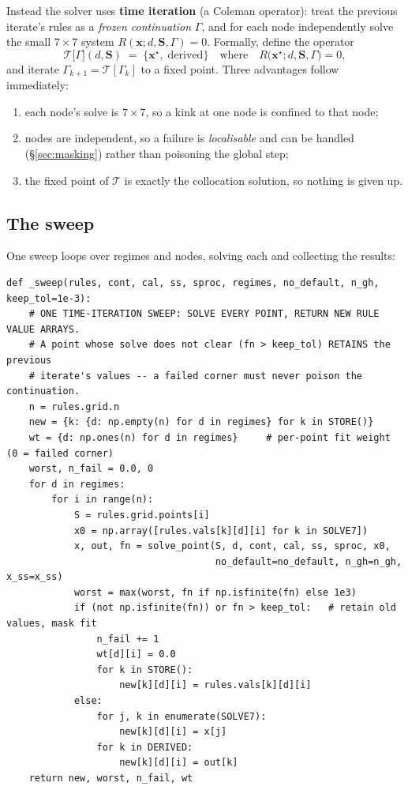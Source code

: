 \documentclass[11pt]{article}
\numberwithin{equation}{section}
\newcommand{\code}[1]{\texttt{\small #1}}
\newcommand{\bx}{\mathbf{x}}
\newcommand{\bS}{\mathbf{S}}
\theoremstyle{definition}
\theoremstyle{plain}
\theoremstyle{remark}
\begin{document}
Instead the solver uses \textbf{time iteration} (a Coleman operator): treat the
previous iterate's rules as a \emph{frozen continuation} $\Gamma$, and for each node
independently solve the small $7\times7$ system $R(\bx;d,\bS,\Gamma)=0$. Formally,
define the operator
\begin{equation}
\mathcal{T}\bigl[\Gamma\bigr](d,\bS)\;=\;\bigl\{\bx^{\star},\;\text{derived}\bigr\}
\quad\text{where}\quad R\bigl(\bx^{\star};d,\bS,\Gamma\bigr)=0 ,
\label{eq:coleman}
\end{equation}
and iterate $\Gamma_{k+1}=\mathcal{T}[\Gamma_k]$ to a fixed point. Three advantages
follow immediately:

\begin{enumerate}
\item each node's solve is $7\times7$, so a kink at one node is confined to that node;
\item nodes are independent, so a failure is \emph{localisable} and can be handled
      (\S\ref{sec:masking}) rather than poisoning the global step;
\item the fixed point of $\mathcal{T}$ is exactly the collocation solution, so
      nothing is given up.
\end{enumerate}

\subsection{The sweep}

One sweep loops over regimes and nodes, solving each and collecting the results:

\begin{lstlisting}[caption={One time-iteration sweep. \code{recursive\_main.py}, \code{\_sweep}.}]
def _sweep(rules, cont, cal, ss, sproc, regimes, no_default, n_gh, keep_tol=1e-3):
    # ONE TIME-ITERATION SWEEP: SOLVE EVERY POINT, RETURN NEW RULE VALUE ARRAYS.
    # A point whose solve does not clear (fn > keep_tol) RETAINS the previous
    # iterate's values -- a failed corner must never poison the continuation.
    n = rules.grid.n
    new = {k: {d: np.empty(n) for d in regimes} for k in STORE()}
    wt = {d: np.ones(n) for d in regimes}     # per-point fit weight (0 = failed corner)
    worst, n_fail = 0.0, 0
    for d in regimes:
        for i in range(n):
            S = rules.grid.points[i]
            x0 = np.array([rules.vals[k][d][i] for k in SOLVE7])
            x, out, fn = solve_point(S, d, cont, cal, ss, sproc, x0,
                                     no_default=no_default, n_gh=n_gh, x_ss=x_ss)
            worst = max(worst, fn if np.isfinite(fn) else 1e3)
            if (not np.isfinite(fn)) or fn > keep_tol:   # retain old values, mask fit
                n_fail += 1
                wt[d][i] = 0.0
                for k in STORE():
                    new[k][d][i] = rules.vals[k][d][i]
            else:
                for j, k in enumerate(SOLVE7):
                    new[k][d][i] = x[j]
                for k in DERIVED:
                    new[k][d][i] = out[k]
    return new, worst, n_fail, wt
\end{lstlisting}
\end{document}
